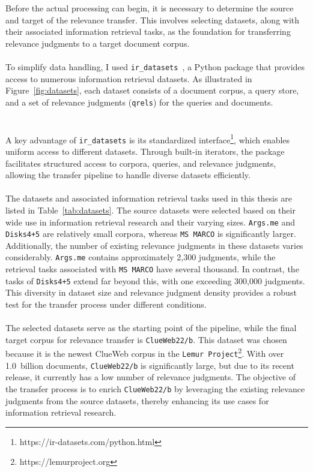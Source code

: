 Before the actual processing can begin, it is necessary to determine the source and target of the relevance transfer. This involves selecting datasets, along with their associated information retrieval tasks, as the foundation for transferring relevance judgments to a target document corpus.
\\\\
To simplify data handling, I used \texttt{ir\_datasets}~\citep{macavaney:2021}, a Python package that provides access to numerous information retrieval datasets. As illustrated in Figure~\ref{fig:datasets}, each dataset consists of a document corpus, a query store, and a set of relevance judgments (\texttt{qrels}) for the queries and documents.
\\\\\\
A key advantage of \texttt{ir\_datasets} is its standardized interface\footnote{https://ir-datasets.com/python.html}, which enables uniform access to different datasets. Through built-in iterators, the package facilitates structured access to corpora, queries, and relevance judgments, allowing the transfer pipeline to handle diverse datasets efficiently.
\\\\
The datasets and associated information retrieval tasks used in this thesis are listed in Table~\ref{tab:datasets}. The source datasets were selected based on their wide use in information retrieval research and their varying sizes. \texttt{Args.me} and \texttt{Disks4+5} are relatively small corpora, whereas \texttt{MS MARCO} is significantly larger. Additionally, the number of existing relevance judgments in these datasets varies considerably. \texttt{Args.me} contains approximately 2,300 judgments, while the retrieval tasks associated with \texttt{MS MARCO} have several thousand. In contrast, the tasks of \texttt{Disks4+5} extend far beyond this, with one exceeding 300,000 judgments. This diversity in dataset size and relevance judgment density provides a robust test for the transfer process under different conditions.
\\\\
The selected datasets serve as the starting point of the pipeline, while the final target corpus for relevance transfer is \texttt{ClueWeb22/b}. This dataset was chosen because it is the newest ClueWeb corpus in the \texttt{Lemur Project}\footnote{https://lemurproject.org}. With over 1.0~billion documents, \texttt{ClueWeb22/b} is significantly large, but due to its recent release, it currently has a low number of relevance judgments. The objective of the transfer process is to enrich \texttt{ClueWeb22/b} by leveraging the existing relevance judgments from the source datasets, thereby enhancing its use cases for information retrieval research.
\pagebreak


